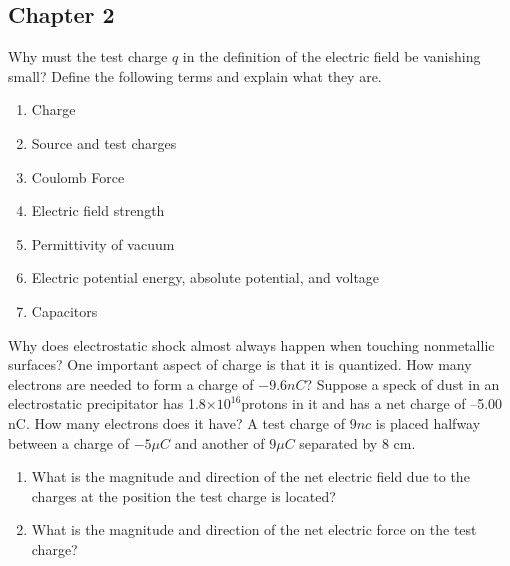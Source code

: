 \documentclass[12pt,addpoints]{exam}
\begin{document}
\begin{questions}
		\subsection*{Chapter 2}
		\question Why must the test charge $q$ in the definition of the electric field be vanishing small?\vspace{1.5in}
		\question Define the following terms and explain what they are.
		\begin{enumerate}[label=(\roman*)]
			\item Charge\vspace{1in}
			\item Source and test charges\vspace{1in}
			\item Coulomb Force\vspace{1in}
			\item Electric field strength\vspace{1in}
			\item Permittivity of vacuum\vspace{1in}
			\item Electric potential energy, absolute potential, and voltage\vspace{1in}
			\item Capacitors\vspace{1in}
		\end{enumerate}
		\question Why does electrostatic shock almost always happen when touching nonmetallic surfaces?\vspace{1.5in}
		\question One important aspect of charge is that it is quantized. How many electrons are needed to form a charge of $-9.6nC$?\vspace{1.5in}
		\question Suppose a speck of dust in an electrostatic precipitator has 1.8$\times10^{16}$protons in it and has a net charge of –5.00 nC. How many electrons does it have?\vspace{1.5in}
		\question A test charge of $9nc$ is placed halfway between a charge of $-5\mu C$ and another of $9\mu C$ separated by 8 cm.
		\begin{enumerate}[label=(\roman*)]
			\item What is the magnitude and direction of the net electric field due to the charges at the position the test charge is located?\vspace{2.5in}
			\item What is the magnitude and direction of the net electric force on the test charge?\vspace{1.5in}
		\end{enumerate}

\end{questions}
\end{document}
